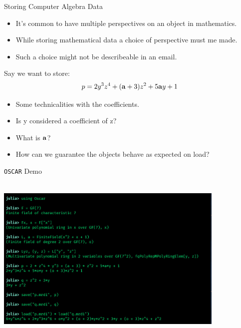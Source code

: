 \documentclass[9pt]{beamer}
\newcommand\oscar{\texttt{OSCAR}\xspace}
\theoremstyle{definition}
\begin{document}
\begin{frame}[fragile]{Storing Computer Algebra Data}
  \begin{itemize}
    \item It's common to have multiple perspectives on an object in mathematics. 
    \item While storing mathematical data a choice of perspective must me made.
    \item Such a choice might not be describeable in an email.
    \end{itemize}

  Say we want to store:
  \begin{align*}
    p = 2y^3z^4 + (\bold{a} + 3)z^2 + 5\bold{a}y + 1
  \end{align*} \pause

  \begin{itemize}
  \item Some technicalities with the coefficients.
  \item Is y considered a coefficient of z?
  \item What is $\bold{a}$?
  \item How can we guarantee the objects behave as expected on load?
  \end{itemize}
\end{frame}


\begin{frame}[fragile]{\oscar Demo}
  \begin{center}
    \includegraphics[height=8cm, width=11cm]{images/demo}
  \end{center}
\end{frame}
\end{document}
